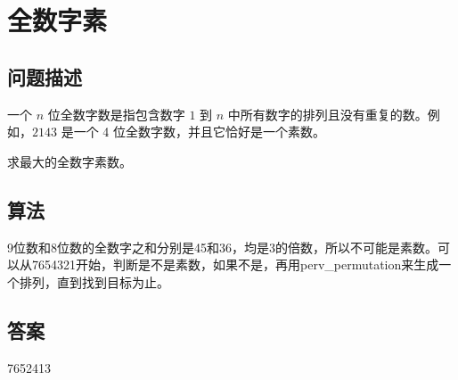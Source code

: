 \section{全数字素}\label{sec:problem41}
\subsection{问题描述}
\begin{tcolorbox}
一个 $n$ 位全数字数是指包含数字 $1$ 到 $n$ 中所有数字的排列且没有重复的数。例如，$2143$ 是一个 4 位全数字数，并且它恰好是一个素数。

求最大的全数字素数。
\end{tcolorbox}

\subsection{算法}
9位数和8位数的全数字之和分别是45和36，均是3的倍数，所以不可能是素数。可以从7654321开始，判断是不是素数，如果不是，再用perv\_permutation来生成一个排列，直到找到目标为止。

\subsection{答案}
7652413
